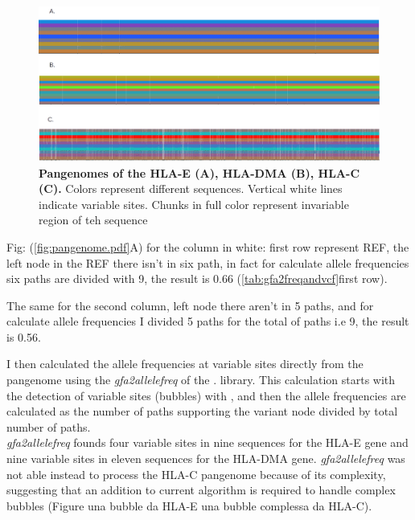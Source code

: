 \begin{figure}[H]
\centering
\includegraphics[width=1.00\textwidth]{fig/pangenomes.png}
\decoRule
\caption{\textbf{Pangenomes of the HLA-E (A), HLA-DMA (B), HLA-C (C).} Colors represent different sequences. Vertical white lines indicate variable sites. Chunks in full color represent invariable region of teh sequence}
\label{fig:pangenomesHLA.png}
\end{figure}




Fig: (\ref{fig:pangenome.pdf}A)  for the column in white: first row represent REF, the left node in the REF there isn't in six path, in fact for calculate allele frequencies six paths are divided with 9, the result is 0.66 (\ref{tab:gfa2freqandvcf}first row).

The same for the second column, left node there aren't in 5 paths, and for calculate allele frequencies I divided 5 paths for the total of paths i.e  9, the result is 0.56.





I then calculated the allele frequencies at variable sites directly from the pangenome using the \textit{gfa2allelefreq} of the \vgp. library. This calculation starts with the detection of variable sites (bubbles) with \bbp, and then the allele frequencies are calculated as the number of paths supporting the variant node divided by total number of paths.\\


\textit{gfa2allelefreq} founds four variable sites in nine sequences for the HLA-E gene and nine variable sites in eleven sequences for the HLA-DMA gene. \textit{gfa2allelefreq} was not able instead to process the HLA-C pangenome because of its complexity, suggesting  
that an addition to current algorithm is required to handle complex bubbles (Figure  una bubble da HLA-E una bubble complessa da HLA-C).   






